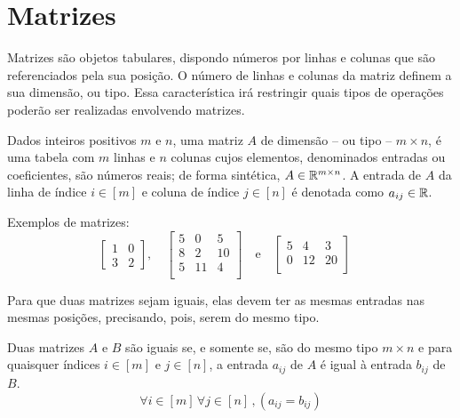 \section{Matrizes}

Matrizes são objetos tabulares, dispondo números por linhas e colunas que são referenciados
pela sua posição.
O número de linhas e colunas da matriz definem a sua dimensão, ou tipo.
Essa característica irá restringir quais tipos de operações poderão ser realizadas
envolvendo matrizes.

\begin{def:matriz}
Dados inteiros positivos $m$ e $n$, uma matriz $A$ de dimensão -- ou tipo -- $m \times n$,
é uma tabela com $m$ linhas e $n$ colunas cujos elementos, denominados entradas ou
coeficientes, são números reais; de forma sintética, $A \in \mathbb{R}^{m \times n}$.
A entrada de $A$ da linha de índice $i \in [m]$ e coluna de índice $j \in [n]$ é denotada
como $a_{ij} \in \mathbb{R}$.
\end{def:matriz}

\begin{exp:repr matriz}
Exemplos de matrizes:
\[
	\begin{bmatrix}
		1 & 0 \\
		3 & 2
	\end{bmatrix}, \quad
	\begin{bmatrix}
		5 & 0  & 5  \\
		8 & 2  & 10 \\
		5 & 11 & 4  \\
	\end{bmatrix} \quad \text{e} \quad
	\begin{bmatrix}
		5 & 4  & 3  \\
		0 & 12 & 20 \\
	\end{bmatrix} \quad
\]
\end{exp:repr matriz}

Para que duas matrizes sejam iguais, elas devem ter as mesmas entradas nas mesmas posições,
precisando, pois, serem do mesmo tipo.

\begin{def:igualdade matrizes}
Duas matrizes $A$ e $B$ são iguais se, e somente se, são do mesmo tipo $m \times n$ e
para quaisquer índices $i \in [m]$ e $j \in [n]$, a entrada $a_{ij}$ de $A$ é igual à
entrada $b_{ij}$ de $B$.
\[
	\forall i \in [m]\,\forall j \in [n]\,, ( a_{ij} = b_{ij} )
\]
\end{def:igualdade matrizes}

